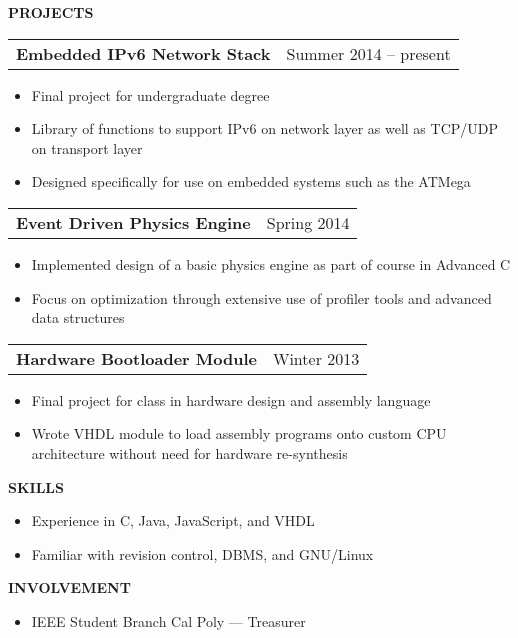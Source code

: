 \documentclass[12pt]{article}
\begin{document}
\textbf{PROJECTS}
\begin{adjustwidth*}{3em}{0em}
  \vspace*{-3mm}
  \begin{tabularx}{\linewidth}{@{}XR@{}}
    \textbf{Embedded IPv6 Network Stack} & Summer 2014 -- present
  \end{tabularx}
  \begin{itemize}
  \item Final project for undergraduate degree
  \item Library of functions to support IPv6 on network layer as well as TCP/UDP on transport layer
  \item Designed specifically for use on embedded systems such as the ATMega
  \end{itemize}

  \begin{tabularx}{\linewidth}{@{}XR@{}}
    \textbf{Event Driven Physics Engine} & Spring 2014
  \end{tabularx}
  \begin{itemize}
  \item Implemented design of a basic physics engine as part of course in Advanced C
  \item Focus on optimization through extensive use of profiler tools and advanced data structures
  \end{itemize}

  \begin{tabularx}{\linewidth}{@{}XR@{}}
    \textbf{Hardware Bootloader Module} &  Winter 2013
  \end{tabularx}
  \begin{itemize}
  \item Final project for class in hardware design and assembly language
  \item Wrote VHDL module to load assembly programs onto custom CPU architecture without need for hardware re-synthesis
  \end{itemize}

\end{adjustwidth*}

\textbf{SKILLS}
\begin{adjustwidth*}{3em}{0em}
  \begin{itemize}
  \item Experience in C, Java, JavaScript, and VHDL
  \item Familiar with revision control, DBMS, and GNU/Linux
  \end{itemize}
\end{adjustwidth*}

\textbf{INVOLVEMENT}
\begin{adjustwidth*}{3em}{0em}
  \begin{itemize}
  \item IEEE Student Branch Cal Poly --- Treasurer
  \end{itemize}
\end{adjustwidth*}
\end{document}
